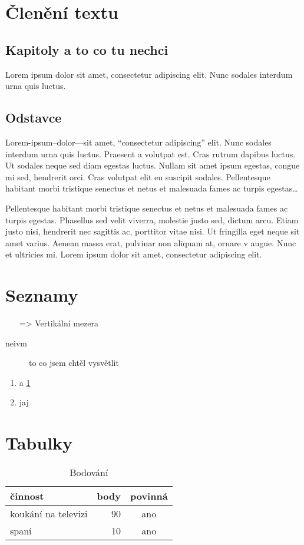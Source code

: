 \documentclass{article}
\begin{document}
\tableofcontents
\section{Členění textu}
	\subsection[Kapitoly]{Kapitoly a to co tu nechci}
	
	Lorem ipsum dolor sit amet, consectetur adipiscing elit. Nunc sodales interdum urna quis luctus. 
	\subsection{Odstavce}
		Lorem-ipsum--dolor---sit amet, \enquote{consectetur adipiscing} elit. Nunc sodales interdum urna quis luctus. Praesent a volutpat est. Cras rutrum dapibus luctus. Ut sodales neque sed diam egestas luctus. Nullam sit amet ipsum egestas, congue mi sed, hendrerit orci. Cras volutpat elit eu suscipit sodales. Pellentesque habitant morbi tristique senectus et netus et malesuada fames ac turpis egestas\dots

	Pellentesque habitant morbi tristique senectus et netus et malesuada fames ac turpis egestas. Phasellus sed velit viverra, molestie justo sed, dictum arcu. Etiam justo nisi, hendrerit nec sagittis ac, porttitor vitae nisi. Ut fringilla eget neque sit amet varius. Aenean massa erat, pulvinar non aliquam at, ornare v augue. Nunc et ultricies mi. Lorem ipsum dolor sit amet, consectetur adipiscing elit.
\section{Seznamy}
\begin{itemize}
\item [=>]Vertikální mezera 
\end{itemize}
\begin{description}
\item[neivm] to co jsem chtěl vysvětlit
\end{description}
\begin{enumerate}
\item a \ref{pic:a}
\item jaj
\end{enumerate}
\section{Tabulky}
\begin{table}\centering
\caption{Bodování} \label{pic:a}
\begin{tabular}{p{3cm}|r|c}

činnost &body &povinná  \\ \hline \hline
koukání na televizi & 90 & ano \\ \hline
spaní & 10 & ano 


\end{tabular}

\end{table}
\end{document}
